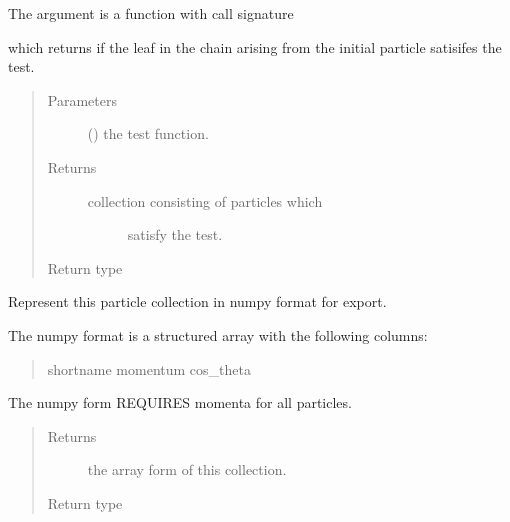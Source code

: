 \documentclass[letterpaper,10pt,english]{sphinxmanual}
\begin{document}
\begin{fulllineitems}
\begin{fulllineitems}
The argument  is a function with call signature
\begin{quote}

\end{quote}

which returns  if the leaf  in the chain arising from
the initial particle  satisifes the test.
\begin{quote}\begin{description}
\item[{Parameters}] \leavevmode
{} () \textendash{} the test function.

\item[{Returns}] \leavevmode
\begin{description}
\item[{collection consisting of particles which}] \leavevmode
satisfy the test.

\end{description}


\item[{Return type}] \leavevmode
{\hyperref[\detokenize{code_structure:scdc.particle.ParticleCollection}]{}}

\end{description}\end{quote}

\end{fulllineitems}


\begin{fulllineitems}
\label{\detokenize{code_structure:scdc.particle.ParticleCollection.to_npy}}
Represent this particle collection in numpy format for export.

The numpy format is a structured array with the following columns:
\begin{quote}

shortname    momentum    cos\_theta
\end{quote}

The numpy form REQUIRES momenta for all particles.
\begin{quote}\begin{description}
\item[{Returns}] \leavevmode
the array form of this collection.

\item[{Return type}] \leavevmode
{}

\end{description}\end{quote}

\end{fulllineitems}


\end{fulllineitems}
\end{document}
